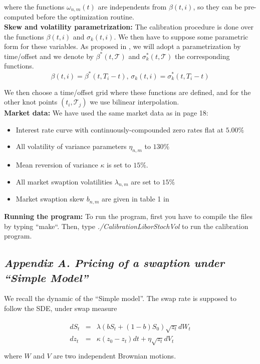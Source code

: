 \documentclass[12pt,a4paper]{article}
\begin{document}
where the functions $\omega_{n,m}(t)$ are independents from $\beta(t,i)$, so they can be pre-computed before the optimization routine.\\

 
 \textbf{Skew and volatility parametrization:} The calibration procedure is done over the functions $\beta(t,i)$ and $\sigma_k(t,i)$. We then have to suppose some parametric form for these variables. As proposed in \cite{Pit04}, we will adopt a parametrization by time/offset and we denote by 
$\beta^*(t, \mathcal{T})$  and $\sigma_k^*(t, \mathcal{T})$ the corresponding functions.
$$
\beta(t, i) = \beta^*(t, T_i-t) \text{, } \sigma_k(t, i) = \sigma_k^*(t, T_i-t)
$$
 
We then choose a time/offset grid where these functions are defined, and for the other knot points $(t_i, \mathcal{T}_j)$ we use bilinear interpolation.\\

\textbf{Market data:} We have used the same market data as in \cite{Pit04} page 18:

\begin{itemize}
 \item  Interest rate curve with continuously-compounded zero rates flat at $5.00\%$
 \item  All volatility of variance parameters $\eta_{n,m}$ to $130\%$
 \item  Mean reversion of variance $\kappa$ is set to $15\%$.
 \item  All market swaption volatilities $\lambda_{n,m}$ are set to $15\%$
 \item  Market swaption skew $b_{n,m}$ are given in table 1 in \cite{Pit04}
\end{itemize}

\textbf{Running the program:}
To run the program, first you have to compile the files by typing ``make``.
Then, type \textit{./CalibrationLiborStochVol} to run the calibration program.


\newpage
\appendix
\subsection*{\textsl{Appendix A. Pricing of a swaption under ``Simple Model''}}
We recall the dynamic of the ``Simple model''. The swap rate is supposed to follow the SDE, under swap measure

\begin{eqnarray*}
\label{simple}
\begin{array}{rll}
  d S_t &=&  \lambda\left( bS_t + (1-b)S_0\right)  \sqrt{z_t} dW_t\\
  d z_t &=& \kappa (z_0 - z_t) dt + \eta \sqrt{z_t} d V_t \\
   \end{array}
\end{eqnarray*}
where $W$ and $V$ are two independent Brownian motions.\\
\end{document}
